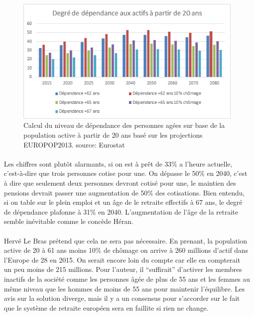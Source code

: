 \begin{figure}[h!]
    \begin{center}
        \includegraphics[scale=0.9]{document/real_dep.png}
        \caption{Calcul du niveau de dépendance des personnes agées sur base de la population active à partir de 20 ans basé sur les projections EUROPOP2013. source: Eurostat\citep{eurostat_europop13}}
        \label{real_dep}
    \end{center}
\end{figure}

\paragraph{}Les chiffres sont plutôt alarmants, si on est à prêt de 33\% a l’heure actuelle, c’est-à-dire que trois personnes cotise pour une. On dépasse le 50\% en 2040, c’est à dire que seulement deux personnes devront cotisé pour une, le maintien des pensions devrait passer une augmentation de 50\% des cotisations. Bien entendu, si on table sur le plein emploi et un âge de le retraite effectifs à 67 ans, le degré de dépendance plafonne à 31\% en 2040. L’augmentation de l’âge de la retraite semble inévitable comme le concède Héran\citep[pp.18]{heran}.

\paragraph{}Hervé Le Bras\citep[pp.19-39]{heran} prétend que cela ne sera pas nécessaire. En prenant, la population active de 20 à 61 ans moins 10\% de chômage on arrive à 260 millions d’actif dans l’Europe de 28 en 2015. On serait encore loin du compte car elle en compterait un peu moins de 215 millions\citep[pp.36]{heran}. Pour l’auteur, il “suffirait” d'activer les membres inactifs de la société comme les personnes âgée de plus de 55 ans et les femmes au même niveau que les hommes de moins de 55 ans pour maintenir l’équilibre. Les avis sur la solution diverge, mais il y a un consensus pour s’accorder sur le fait que le système de retraite européen sera en faillite si rien ne change. 

